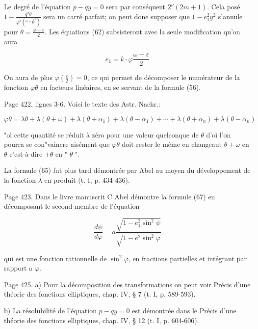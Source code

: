 \documentclass{article}
\begin{document}
Le degré de l'équation \(p-q y=0\) sera par conséquent \(2^{\nu}(2 m+1)\). Cela posé \(1-\frac{q^{2} \theta}{\varphi^{2}\left({ }^{\omega-} \bar{\theta}^{\varepsilon}\right)}\) sera un carré parfait; on peut done supposer que \(1-e_{1}^{2} y^{2}\) s'annule pour \(\theta=\frac{\omega-\varepsilon}{2}\). Les équations (62) subsisteront avec la seule modification qu'on aura

\[
e_{1}=k \cdot \varphi \frac{\omega-\varepsilon}{2}
\]

On aura de plus \(\varphi\left(\frac{\varepsilon}{2}\right)=0\), ce qui permet de décomposer le numérateur de la fonction \(\varphi \theta\) en facteurs linéaires, en se servant de la formule (56).

Page 422, lignes 3-6. Voici le texte des Astr. Nachr.:

\[
\varphi \theta=\lambda \theta+\lambda(\theta+\omega)+\lambda\left(\theta+\alpha_{1}\right)+\lambda\left(\theta-\alpha_{1}\right)+\cdots+\lambda\left(\theta+\alpha_{n}\right)+\lambda\left(\theta-\alpha_{n}\right)
\]

"oì cette quantité se réduit à zéro pour une valeur quelconque de \(\theta\) d'oì l'on pourra se con"vaincre aisément que \(\varphi \theta\) doit rester le même en changeaut \(\theta+\omega\) en \(\theta\) c'est-à-dire \(+\theta\) en " \(\theta\) ".

La formule (65) fut plus tard démontrée par Abel au moyen du développement de la fonction \(\lambda\) en produit (t. I, p. 434-436).

Page 423. Dans le livre manuscrit C Abel démontre la formule (67) en décomposant le second membre de l'équation

\[
\frac{d \psi}{d \varphi}=a \frac{\sqrt{1-e_{1}^{2} \sin ^{2} \psi}}{\sqrt{1-e^{2} \sin ^{2} \varphi}}
\]

qui est une fonction rationnelle de \(\sin ^{2} \varphi\), en fractions partielles et intégrant par rapport a \(\varphi\).

Page 425. a) Pour la décomposition des transformations on peut voir Précis d'une théorie des fonctions elliptiques, chap. IV, § 7 (t. I, p. 589-593).

b) La résolubilité de l'équation \(p-q y=0\) est démontrée dans le Précis d'une théorie des fonctions elliptiques, chap. IV, § 12 (t. I, p. 604-606).
\end{document}
